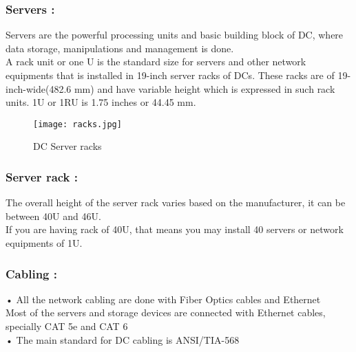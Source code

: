 \documentclass[12pt,a4paper]{report}
\begin{document}
\subsubsection{Servers :} Servers are the powerful processing units and basic building block of DC, where data storage, manipulations and management is done.\\ 
A rack unit or one U is the standard size for servers and other network equipments that is installed in 19-inch server racks of DCs. These racks are of 19-inch-wide(482.6 mm) and have variable height which is expressed in such rack units. 
1U or 1RU is 1.75 inches or 44.45 mm.\\

\begin{figure}[h]
\begin{center}
\texttt{[image: racks.jpg]}
\caption{DC Server racks}
\end{center}
\end{figure}

\subsubsection{Server rack :} The overall height of the server rack varies based on the manufacturer, it can be between 40U and 46U.\\ If you are having rack of 40U, that means you may install 40 servers or network equipments of 1U.

\subsubsection{Cabling :} 
\vspace*{0.1 in}
•	All the network cabling are done with Fiber Optics cables and Ethernet \\
\vspace*{0.1 in}
Most of the servers and storage devices are connected  with Ethernet cables, specially CAT 5e and CAT 6 \\
\vspace*{0.1 in}
•	The main standard for DC cabling is ANSI/TIA-568 \\

  
\end{document}
